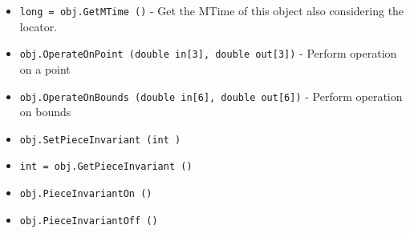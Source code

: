 \begin{itemize}
\item  \verb|long = obj.GetMTime ()| -  Get the MTime of this object also considering the locator.

\item  \verb|obj.OperateOnPoint (double in[3], double out[3])| -  Perform operation on a point

\item  \verb|obj.OperateOnBounds (double in[6], double out[6])| -  Perform operation on bounds

\item  \verb|obj.SetPieceInvariant (int )|

\item  \verb|int = obj.GetPieceInvariant ()|

\item  \verb|obj.PieceInvariantOn ()|

\item  \verb|obj.PieceInvariantOff ()|

\end{itemize}
